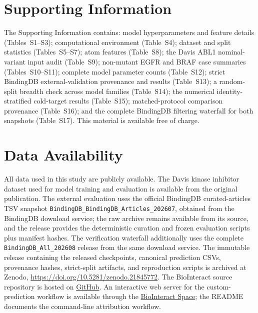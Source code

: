 \documentclass[fleqn,10pt]{wlscirep}
\begin{document}
\section*{Supporting Information}

The Supporting Information contains: model hyperparameters and feature details
(Tables~S1--S3); computational environment (Table~S4); dataset and split
statistics (Tables~S5--S7); atom features (Table~S8); the Davis ABL1
nominal-variant input audit (Table~S9); non-mutant EGFR and BRAF case summaries
(Tables~S10--S11); complete model parameter counts (Table~S12); strict
BindingDB external-validation provenance and results (Table~S13);
a random-split breadth check across model families
(Table~S14); the numerical identity-stratified cold-target results
(Table~S15); matched-protocol comparison provenance (Table~S16); and the
complete BindingDB filtering waterfall for both snapshots (Table~S17).
This material is available free of charge.

\section*{Data Availability}

All data used in this study are publicly available. The Davis kinase inhibitor
dataset used for model training and evaluation is available from the original
publication.\cite{davis2011comprehensive} The external evaluation uses the official
BindingDB curated-articles TSV snapshot
\texttt{BindingDB\_BindingDB\_Articles\_202607}, obtained from the BindingDB
download service;\cite{gilson2016bindingdb} the raw archive remains available from
its source, and the release provides the deterministic curation and frozen
evaluation scripts plus manifest hashes.
The verification waterfall additionally uses the complete
\texttt{BindingDB\_All\_202608} release from the same download service.
The immutable release containing the
released checkpoints, canonical prediction CSVs, provenance hashes, strict-split
artifacts, and reproduction scripts is archived at Zenodo,
\url{https://doi.org/10.5281/zenodo.21845772}. The BioInteract source repository
is hosted on \href{https://github.com/Liubo-520/bio-intelligence}{GitHub}. An interactive web
server for the custom-prediction workflow is available through the
\href{https://huggingface.co/spaces/AI4deeperScience/BioInteract}{BioInteract Space}; the README
documents the command-line attribution workflow.
\end{document}
